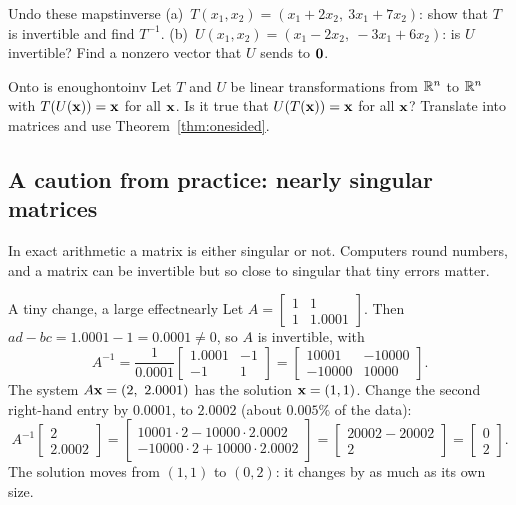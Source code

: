 \documentclass[11pt]{article}
\begin{document}
\begin{kc}{Undo these maps}{tinverse}
(a)~$T(x_1,x_2)=(x_1+2x_2,\ 3x_1+7x_2)$: show that $T$ is invertible and find $T^{-1}$. (b)~$U(x_1,x_2)=(x_1-2x_2,\ -3x_1+6x_2)$: is $U$ invertible? Find a nonzero vector that $U$ sends to $\mathbf{0}$.
\end{kc}

\begin{think}{Onto is enough}{ontoinv}
Let $T$ and $U$ be linear transformations from $\mathbb{R}^n$ to $\mathbb{R}^n$ with $T(U(\mathbf{x}))=\mathbf{x}$ for all $\mathbf{x}$. Is it true that $U(T(\mathbf{x}))=\mathbf{x}$ for all $\mathbf{x}$? Translate into matrices and use Theorem~\ref{thm:onesided}.
\end{think}

\subsection*{A caution from practice: nearly singular matrices}

In exact arithmetic a matrix is either singular or not. Computers round numbers, and a matrix can be invertible but so close to singular that tiny errors matter.

\begin{exmp}{A tiny change, a large effect}{nearly}
Let $A=\begin{bmatrix}1&1\\1&1.0001\end{bmatrix}$. Then $ad-bc=1.0001-1=0.0001\neq0$, so $A$ is invertible, with
\[
A^{-1}=\frac1{0.0001}\begin{bmatrix}1.0001&-1\\-1&1\end{bmatrix}=\begin{bmatrix}10001&-10000\\-10000&10000\end{bmatrix}.
\]
The system $A\mathbf{x}=(2,\ 2.0001)$ has the solution $\mathbf{x}=(1,1)$. Change the second right-hand entry by $0.0001$, to $2.0002$ (about $0.005\%$ of the data):
\[
A^{-1}\begin{bmatrix}2\\2.0002\end{bmatrix}=\begin{bmatrix}10001\cdot2-10000\cdot2.0002\\-10000\cdot2+10000\cdot2.0002\end{bmatrix}=\begin{bmatrix}20002-20002\\2\end{bmatrix}=\begin{bmatrix}0\\2\end{bmatrix}.
\]
The solution moves from $(1,1)$ to $(0,2)$: it changes by as much as its own size.
\end{exmp}
\end{document}
